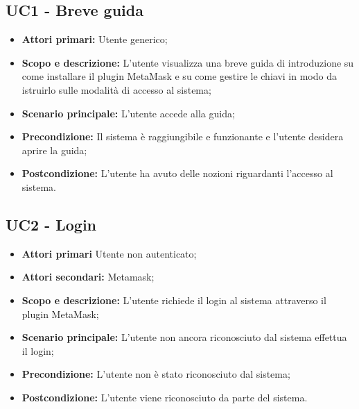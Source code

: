 \documentclass[AnalisiDeiRequisiti.tex]{subfiles}
\begin{document}
\subsection{UC1 - Breve guida}
\begin{itemize}
	\item \textbf{Attori primari:} Utente generico;\\
	\item \textbf{Scopo e descrizione:} L'utente visualizza una breve guida di introduzione su come installare il plugin MetaMask e su come gestire le chiavi in modo da istruirlo sulle modalità di accesso al sistema;\\
	\item \textbf{Scenario principale:} L'utente accede alla guida;\\
	\item \textbf{Precondizione:} Il sistema è raggiungibile e funzionante e l'utente desidera aprire la guida;\\
	\item \textbf{Postcondizione:} L'utente ha avuto delle nozioni riguardanti l'accesso al sistema.\\
\end{itemize}
\subsection{UC2 - Login}
\begin{itemize}
	\item \textbf{Attori primari} Utente non autenticato;\\
	\item \textbf{Attori secondari:} Metamask;
	\item \textbf{Scopo e descrizione:} L'utente richiede il login al sistema attraverso il plugin MetaMask;\\
	\item \textbf{Scenario principale:} L'utente non ancora riconosciuto dal sistema effettua il login;\\
	\item \textbf{Precondizione:} L'utente non è stato riconosciuto dal sistema;\\
	\item \textbf{Postcondizione:} L'utente viene riconosciuto da parte del sistema.\\
\end{itemize}
\end{document}
